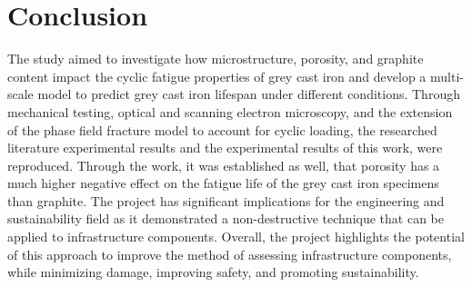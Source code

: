 \documentclass[11pt,a4paper]{article}
\begin{document}
\section{Conclusion}
The study aimed to investigate how microstructure, porosity, and graphite content impact the cyclic fatigue properties of grey cast iron and develop a multi-scale model to predict grey cast iron lifespan under different conditions. Through mechanical testing, optical and scanning electron microscopy, and the extension of the phase field fracture model to account for cyclic loading, the researched literature experimental results and the experimental results of this work, were reproduced. Through the work, it was established as well, that porosity has a much higher negative effect on the fatigue life of the grey cast iron specimens than graphite. The project has significant implications for the engineering and sustainability field as it demonstrated a non-destructive technique that can be applied to infrastructure components. Overall, the project highlights the potential of this approach to improve the method of assessing infrastructure components, while minimizing damage, improving safety, and promoting sustainability.

\cite{Cyclic}


\end{document}

